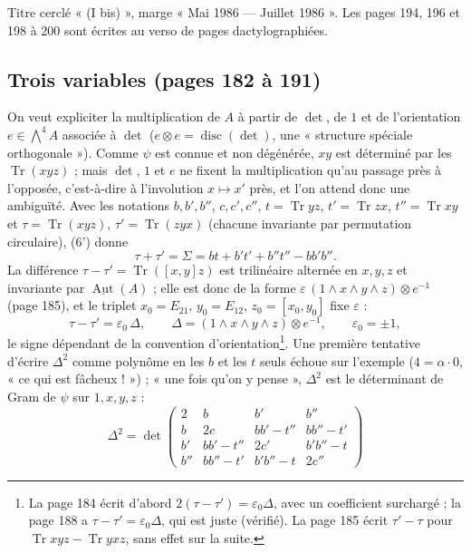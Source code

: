 \documentclass[11pt,a4paper]{article}
\begin{document}
Titre cerclé « (I bis) », marge « Mai 1986 — Juillet 1986 ». Les pages 194,
196 et 198 à 200 sont écrites au verso de pages dactylographiées.

\subsection*{Trois variables (pages 182 à 191)}

On veut expliciter la multiplication de $A$ à partir de $\det$, de $1$ et de
l'orientation $e \in \bigwedge^4 A$ associée à $\det$ ($e \otimes e =
\operatorname{disc}(\det)$, une « structure spéciale orthogonale »). Comme
$\psi$ est connue et non dégénérée, $xy$ est déterminé par les
$\operatorname{Tr}(xyz)$ ; mais $\det$, $1$ et $e$ ne fixent la multiplication
qu'au passage près à l'opposée, c'est-à-dire à l'involution $x \mapsto x'$ près,
et l'on attend donc une ambiguïté. Avec les notations $b, b', b''$, $c, c',
c''$, $t = \operatorname{Tr}yz$, $t' = \operatorname{Tr}zx$, $t'' =
\operatorname{Tr}xy$ et $\tau = \operatorname{Tr}(xyz)$, $\tau' =
\operatorname{Tr}(zyx)$ (chacune invariante par permutation circulaire), (6')
donne
\[
  \tau + \tau' = \Sigma = bt + b't' + b''t'' - bb'b'' .
\]
La différence $\tau - \tau' = \operatorname{Tr}([x, y]z)$ est trilinéaire
alternée en $x, y, z$ et invariante par $\underline{\operatorname{Aut}}(A)$ ; elle
est donc de la forme $\varepsilon\,(1 \wedge x \wedge y \wedge z) \otimes e^{-1}$
(page 185), et le triplet $x_0 = E_{21}$, $y_0 = E_{12}$, $z_0 = [x_0, y_0]$
fixe $\varepsilon$ :
\[
  \tau - \tau' = \varepsilon_0\,\Delta,\qquad \Delta = (1 \wedge x \wedge y \wedge
  z) \otimes e^{-1},\qquad \varepsilon_0 = \pm 1,
\]
le signe dépendant de la convention d'orientation\footnote{La page 184 écrit
d'abord $2(\tau - \tau') = \varepsilon_0\Delta$, avec un coefficient surchargé ;
la page 188 a $\tau - \tau' = \varepsilon_0\Delta$, qui est juste (vérifié). La
page 185 écrit $\tau' - \tau$ pour $\operatorname{Tr}xyz -
\operatorname{Tr}yxz$, sans effet sur la suite.}. Une première tentative
d'écrire $\Delta^2$ comme polynôme en les $b$ et les $t$ seuls échoue sur
l'exemple ($4 = \alpha\cdot 0$, « ce qui est fâcheux ! ») ; « une fois qu'on y
pense », $\Delta^2$ est le déterminant de Gram de $\psi$ sur $1, x, y, z$ :
\[
  \Delta^2 = \det\begin{pmatrix}
    2 & b & b' & b'' \\
    b & 2c & bb' - t'' & bb'' - t' \\
    b' & bb' - t'' & 2c' & b'b'' - t \\
    b'' & bb'' - t' & b'b'' - t & 2c''
  \end{pmatrix}
\]
\end{document}
